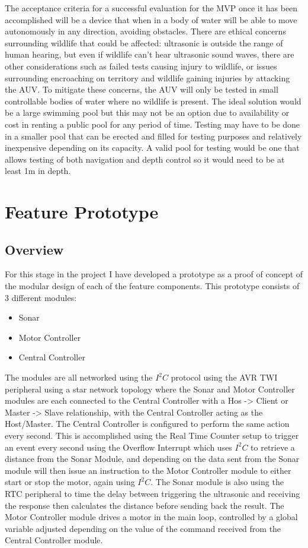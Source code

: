 \documentclass[11pt,a4paper,titlepage]{report}
\begin{document}
	The acceptance criteria for a successful evaluation for the MVP once it has been accomplished will be a device that when in a body of water will be able to move autonomously in any direction, avoiding obstacles. There are ethical concerns surrounding wildlife that could be affected: ultrasonic is outside the range of human hearing, but even if wildlife can't hear ultrasonic sound waves, there are other considerations such as failed tests causing injury to wildlife, or issues surrounding encroaching on territory and wildlife gaining injuries by attacking the AUV. To mitigate these concerns, the AUV will only be tested in small controllable bodies of water where no wildlife is present. The ideal solution would be a large swimming pool but this may not be an option due to availability or cost in renting a public pool for any period of time. Testing may have to be done in a smaller pool that can be erected and filled for testing purposes and relatively inexpensive depending on its capacity. A valid pool for testing would be one that allows testing of both navigation and depth control so it would need to be at least 1\unit{\meter} in depth. 
	
	\chapter*{Feature Prototype}
	
	\section*{Overview}
	For this stage in the project I have developed a prototype as a proof of concept of the modular design of each of the feature components. This prototype consists of 3 different modules:
	\begin{itemize}
		\item Sonar
		\item Motor Controller
		\item Central Controller
	\end{itemize}
	
	The modules are all networked using the $I^{2}C$ protocol using the AVR TWI peripheral using a star network topology where the Sonar and Motor Controller modules are each connected to the Central Controller with a Hos -> Client or Master -> Slave relationship, with the Central Controller acting as the Host/Master. The Central Controller is configured to perform the same action every second. This is accomplished using the Real Time Counter setup to trigger an event every second using the Overflow Interrupt which uses $I^{2}C$ to retrieve a distance from the Sonar Module, and depending on the data sent from the Sonar module will then issue an instruction to the Motor Controller module to either start or stop the motor, again using $I^{2}C$. The Sonar module is also using the RTC peripheral to time the delay between triggering the ultrasonic and receiving the response then calculates the distance before sending back the result. The Motor Controller module drives a motor in the main loop, controlled by a global variable adjusted depending on the value of the command received from the Central Controller module.  
	
\end{document}
